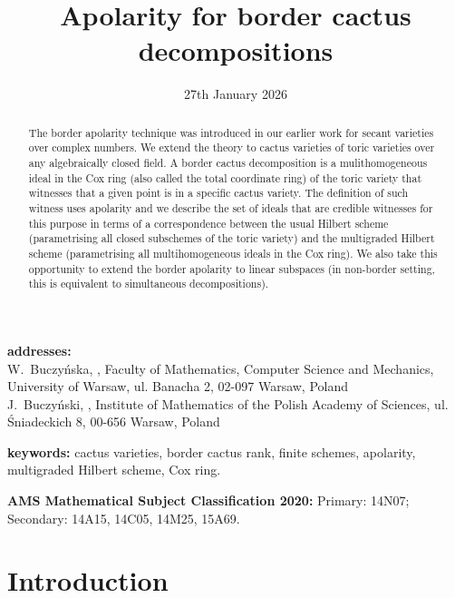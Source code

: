 \documentclass[12pt,a4paper]{article}
\title{Apolarity for border cactus decompositions}
\author{\nisiabu \and \JaBu}
\date{27th January 2026}
\begin{document}
\maketitle
\begin{abstract}
   The border apolarity technique was introduced in our earlier work for secant varieties over complex numbers.
   We extend the theory to cactus varieties of toric varieties over any algebraically closed field.
   A border cactus decomposition is a mulithomogeneous ideal in the Cox ring (also called the total coordinate ring) of the toric variety that witnesses that a given point is in a specific cactus variety.
   The definition of such witness uses apolarity and
   we describe the set of ideals that are credible witnesses for this purpose in terms of a correspondence between the usual Hilbert scheme (parametrising all closed subschemes of the toric variety) and the multigraded Hilbert scheme (parametrising all multihomogeneous ideals in the Cox ring).
   We also take this opportunity to extend the border apolarity to linear subspaces (in non-border setting, this is equivalent to simultaneous decompositions).
\end{abstract}


\medskip
{\footnotesize
\noindent\textbf{addresses:} \\
W.~Buczy\'nska, ,
   Faculty of Mathematics, Computer Science and Mechanics, University of Warsaw, ul. Banacha 2, 02-097 Warsaw, Poland\\
J.~Buczy\'nski, ,
   Institute of Mathematics of the Polish Academy of Sciences, ul. \'Sniadeckich 8, 00-656 Warsaw, Poland\\
}


\noindent\textbf{keywords:}
cactus varieties, border cactus rank, finite schemes, apolarity, multigraded Hilbert scheme,  Cox ring.


\noindent\textbf{AMS Mathematical Subject Classification 2020:}
Primary: 14N07; Secondary: 14A15, 14C05, 14M25, 15A69.

\tableofcontents



\section{Introduction}
\end{document}
